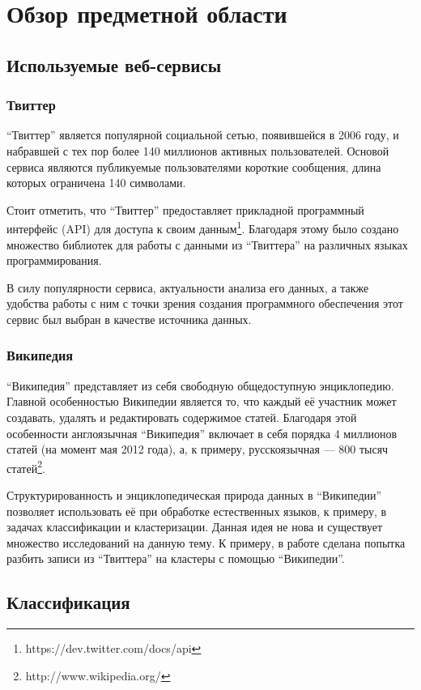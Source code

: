 \chapter{Обзор предметной области}
\label{chap:preliminaries}

\section{Используемые веб-сервисы}
\subsection{Твиттер}
``Твиттер'' является популярной социальной сетью, появившейся в 2006 году, и набравшей с тех пор более 140 миллионов активных пользователей. Основой сервиса являются публикуемые пользователями короткие сообщения, длина которых ограничена 140 символами.

Стоит отметить, что ``Твиттер'' предоставляет прикладной программный интерфейс (API) для доступа к своим данным\footnote{https://dev.twitter.com/docs/api}. Благодаря этому было создано множество библиотек для работы с данными из ``Твиттера'' на различных языках программирования.

В силу популярности сервиса, актуальности анализа его данных, а также удобства работы с ним с точки зрения создания программного обеспечения этот сервис был выбран в качестве источника данных.

\subsection{Википедия}
``Википедия'' представляет из себя свободную общедоступную энциклопедию. Главной особенностью Википедии является то, что каждый её участник может создавать, удалять и редактировать содержимое статей. Благодаря этой особенности англоязычная ``Википедия'' включает в себя порядка 4 миллионов статей (на момент мая 2012 года), а, к примеру, русскоязычная --- 800 тысяч статей\footnote{http://www.wikipedia.org/}.

Структурированность и энциклопедическая природа данных в ``Википедии'' позволяет использовать её при обработке естественных языков, к примеру, в задачах классификации и кластеризации. Данная идея не нова и существует множество исследований на данную тему. К примеру, в работе \cite{Genc:2011:DCC:2021773.2021833} сделана попытка разбить записи из ``Твиттера'' на кластеры с помощью ``Википедии''.

\section{Классификация}
